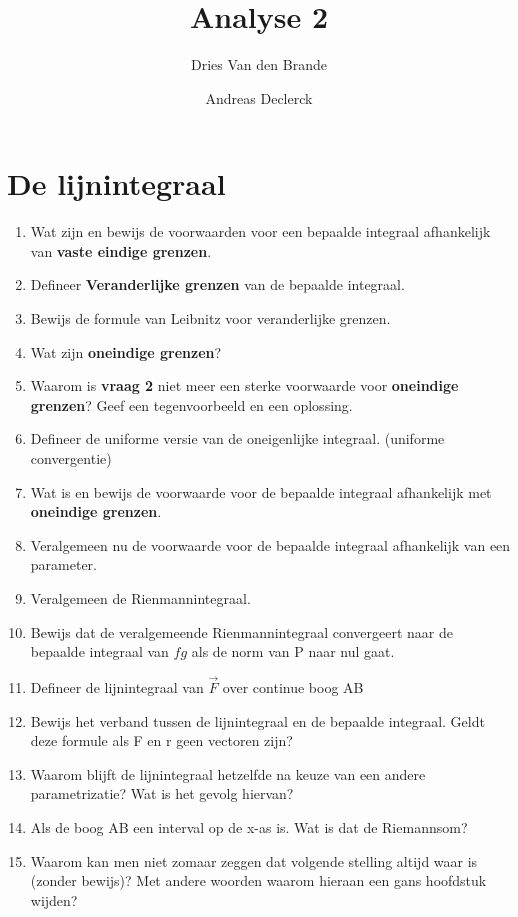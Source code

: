 \documentclass[12pt]{article}
\begin{document}
    \title{Analyse 2}
    \author{Dries Van den Brande \and Andreas Declerck}

    \maketitle
    \section{De lijnintegraal}
    \begin{enumerate}
        \item Wat zijn en bewijs de voorwaarden voor een bepaalde integraal afhankelijk van \textbf{vaste eindige grenzen}.
        \item Defineer \textbf{Veranderlijke grenzen} van de bepaalde integraal.
        \item Bewijs de formule van Leibnitz voor veranderlijke grenzen.
        \item Wat zijn \textbf{oneindige grenzen}?
        \item Waarom is \textbf{vraag 2} niet meer een sterke voorwaarde voor \textbf{oneindige grenzen}? Geef een tegenvoorbeeld en een oplossing.
        \item Defineer de uniforme versie van de oneigenlijke integraal. (uniforme convergentie)
        \item Wat is en bewijs de voorwaarde voor de bepaalde integraal afhankelijk met \textbf{oneindige grenzen}.
        \item Veralgemeen nu de voorwaarde voor de bepaalde integraal afhankelijk van een parameter.
        \item Veralgemeen de Rienmannintegraal.
        \item Bewijs dat de veralgemeende Rienmannintegraal convergeert naar de bepaalde integraal van $fg$ als de norm van P naar nul gaat.
        \item Defineer de lijnintegraal van $\vec{F}$ over continue boog AB
        \item Bewijs het verband tussen de lijnintegraal en de bepaalde integraal. Geldt deze formule als F en r geen vectoren zijn?
        \item Waarom blijft de lijnintegraal hetzelfde na keuze van een andere parametrizatie? Wat is het gevolg hiervan?
        \item Als de boog AB een interval op de x-as is. Wat is dat de Riemannsom?
        \item Waarom kan men niet zomaar zeggen dat volgende stelling altijd waar is (zonder bewijs)? Met andere woorden waarom hieraan een gans hoofdstuk wijden?

\end{enumerate}
\end{document}
